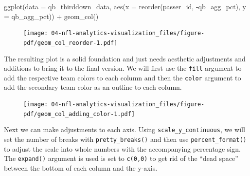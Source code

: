 \documentclass[
  letterpaper,
]{krantz}
\newenvironment{Shaded}{\begin{snugshade}}{\end{snugshade}}
\newcommand{\AttributeTok}[1]{\textcolor[rgb]{0.40,0.45,0.13}{#1}}
\newcommand{\FunctionTok}[1]{\textcolor[rgb]{0.28,0.35,0.67}{#1}}
\newcommand{\NormalTok}[1]{\textcolor[rgb]{0.00,0.23,0.31}{#1}}
\newcommand{\SpecialCharTok}[1]{\textcolor[rgb]{0.37,0.37,0.37}{#1}}
\begin{document}
\begin{Shaded}
\begin{Highlighting}[]
\FunctionTok{ggplot}\NormalTok{(}\AttributeTok{data =}\NormalTok{ qb\_thirddown\_data, }\FunctionTok{aes}\NormalTok{(}\AttributeTok{x =} \FunctionTok{reorder}\NormalTok{(passer\_id, }\SpecialCharTok{{-}}\NormalTok{qb\_agg\_pct), }\AttributeTok{y =}\NormalTok{ qb\_agg\_pct)) }\SpecialCharTok{+}
  \FunctionTok{geom\_col}\NormalTok{()}
\end{Highlighting}
\end{Shaded}

\begin{figure}[H]

{\centering \texttt{[image: 04-nfl-analytics-visualization\_files/figure-pdf/geom\_col\_reorder-1.pdf]}

}

\end{figure}

The resulting plot is a solid foundation and just needs aesthetic
adjustments and additions to bring it to the final version. We will
first use the \texttt{fill} argument to add the respective team colors
to each column and then the \texttt{color} argument to add the secondary
team color as an outline to each column.

\begin{Shaded}
\end{Shaded}

\begin{figure}[H]

{\centering \texttt{[image: 04-nfl-analytics-visualization\_files/figure-pdf/geom\_col\_adding\_color-1.pdf]}

}

\end{figure}

Next we can make adjustments to each axis. Using
\texttt{scale\_y\_continuous}, we will set the number of breaks with
\texttt{pretty\_breaks()} and then use \texttt{percent\_format()} to
adjust the scale into whole numbers with the accompanying percentage
sign. The \texttt{expand()} argument is used is set to \texttt{c(0,0)}
to get rid of the ``dead space'' between the bottom of each column and
the y-axis.
\end{document}
